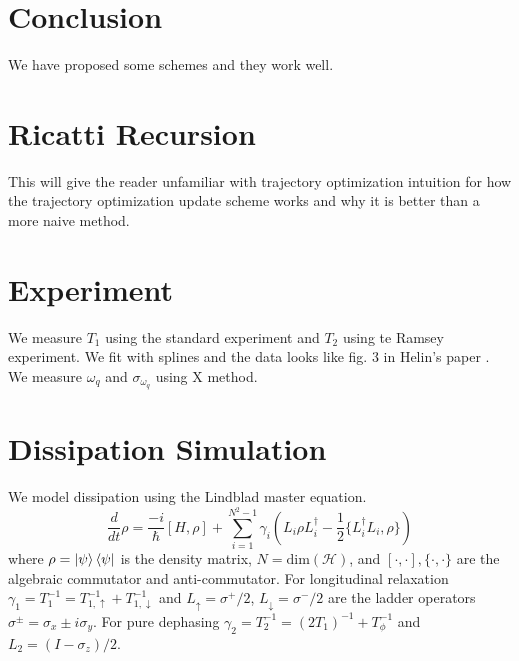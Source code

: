 \documentclass[
  amsfonts,
  amsmath,
  tbtags,
  amssymb,
  aps,
  nobibnotes,
  twocolumn,
]{revtex4-2}
\begin{document}
\section{Conclusion}
We have proposed some schemes and they work well.


\appendix
\section{Ricatti Recursion}
This will give the reader unfamiliar with trajectory
optimization intuition for how the trajectory optimization
update scheme works and why it is better than
a more naive method.


\section{Experiment}
We measure $T_{1}$ using the standard experiment
and $T_{2}$ using te Ramsey experiment. We fit with splines
and the data looks like fig. 3 in Helin's paper \cite{zhang2020universal}.
We measure $\omega_{q}$ and $\sigma_{\omega_{q}}$ using X method.


\section{Dissipation Simulation}
We model dissipation using the Lindblad master
equation. 
\begin{equation}
  \frac{d}{dt} \rho = \frac{-i}{\hbar} [H, \rho] + \sum_{i = 1}^{N^{2} - 1} \gamma_{i} (L_{i} \rho L_{i}^{\dagger} - \frac{1}{2} \{L_{i}^{\dagger} L_{i}, \rho\})
\end{equation}
where $\rho = \ket{\psi}\bra{\psi}$ is the density matrix, $N = \textrm{dim}(\mathcal{H})$,
and $[\cdot, \cdot], \{\cdot, \cdot \}$ are the algebraic commutator and anti-commutator.
For longitudinal relaxation $\gamma_{1} = T_{1}^{-1} = T_{1, \uparrow}^{-1} + T_{1, \downarrow}^{-1}$
and $L_{\uparrow} = \sigma^{+}/2$,
$L_{\downarrow} = \sigma^{-}/2$
are the ladder operators $\sigma^{\pm} = \sigma_{x} \pm i \sigma_{y}$. For pure dephasing
$\gamma_{2} = T_{2}^{-1} = (2 T_{1})^{-1} + T_{\phi}^{-1}$ and
$L_{2} = (I - \sigma_{z})/2$.


\end{document}
